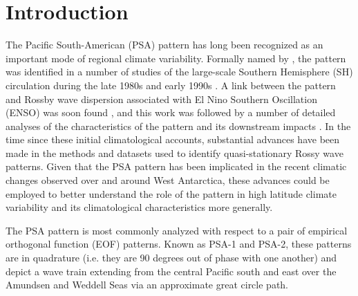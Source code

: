 \section{Introduction}

The Pacific South-American (PSA) pattern has long been recognized as an important mode of regional climate variability. Formally named by \cite{Mo1987}, the pattern was identified in a number of studies of the large-scale Southern Hemisphere (SH) circulation during the late 1980s and early 1990s \citep[e.g.][]{Lau1994}. A link between the pattern and Rossby wave dispersion associated with El Nino Southern Oscillation (ENSO) was soon found \citep[e.g.][]{Karoly1989}, and this work was followed by a number of detailed analyses of the characteristics of the pattern and its downstream impacts \citep[e.g.][]{Mo1998,Mo2000,Mo2001}. In the time since these initial climatological accounts, substantial advances have been made in the methods and datasets used to identify quasi-stationary Rossy wave patterns. Given that the PSA pattern has been implicated in the recent climatic changes observed over and around West Antarctica, these advances could be employed to better understand the role of the pattern in high latitude climate variability and its climatological characteristics more generally.

The PSA pattern is most commonly analyzed with respect to a pair of empirical orthogonal function (EOF) patterns. Known as PSA-1 and PSA-2, these patterns are in quadrature (i.e. they are 90 degrees out of phase with one another) and depict a wave train extending from the central Pacific south and east over the Amundsen and Weddell Seas via an approximate great circle path.   